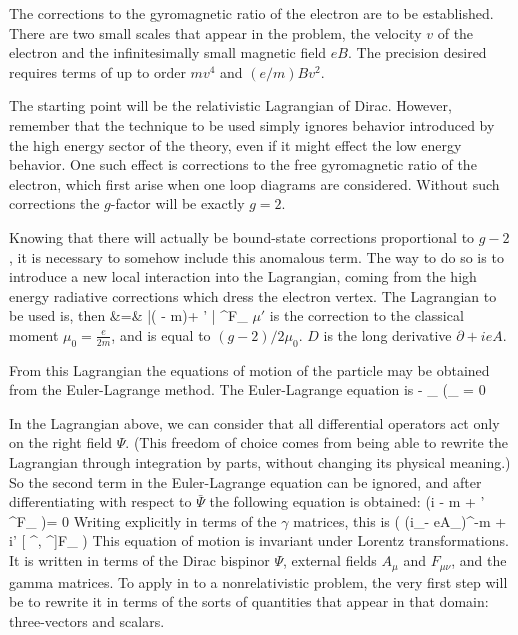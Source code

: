 The corrections to the gyromagnetic ratio of the electron are to be established.  There are two small scales that appear in the problem, the velocity $v$ of the electron and the infinitesimally small magnetic field $eB$.  The precision desired requires terms of up to order $mv^4$ and $ (e/m)Bv^2$.

The starting point will be the relativistic Lagrangian of Dirac.  However, remember that the technique to be used simply ignores behavior introduced by the high energy sector of the theory, even if it might effect the low energy behavior.  One such effect is corrections to the free gyromagnetic ratio of the electron, which first arise when one loop diagrams are considered.  Without such corrections the $g$-factor will be exactly $g=2$.

Knowing that there will actually be bound-state corrections proportional to $g-2$, it is necessary to somehow include this anomalous term.  The way to do so is to introduce a new local interaction into the Lagrangian, coming from the high energy radiative corrections which dress the electron vertex.  The Lagrangian to be used is, then
\beqa
{} &=&	
	\bar{\Psi}( - m)\Psi +  \mu' \bar{\Psi} \sigma^{\mu\nu}F_{\mu\nu} \Psi	
\eeqa
$\mu'$ is the correction to the classical moment $\mu_0 = \frac{e}{2m}$, and is equal to $(g-2)/2 \mu_0$.  $D$ is the long derivative $\partial + ieA$.


From this Lagrangian the equations of motion of the particle may be obtained from the Euler-Lagrange method.  The Euler-Lagrange equation is
\beq
{} - \partial_\mu {} {\partial (\partial_\mu {\bar{\Psi})} } 
	= 0	
\eeq

In the Lagrangian above, we can consider that all differential operators act only on the right field $\Psi$.  (This freedom of choice comes from being able to rewrite the Lagrangian through integration by parts, without changing its physical meaning.)  So the second term in the Euler-Lagrange equation can be ignored, and after differentiating with respect to $\bar{\Psi}$ the following equation is obtained:
\beq
	(i - m +  \mu'  \sigma^{\mu\nu}F_{\mu\nu} )\Psi = 0	
\eeq
Writing explicitly in terms of the $\gamma$ matrices, this is
\beq \label{eq:Sh:eom}
	\left( (i\partial_\mu- eA_\mu)\gamma^\mu -m + i\mu' [ \gamma^\mu, \gamma^\nu]F_{\mu\nu} \right) 
\eeq
This equation of motion is invariant under Lorentz transformations.  It is written in terms of the Dirac bispinor $\Psi$, external fields $A_\mu$ and $F_{\mu\nu}$, and the gamma matrices.  To apply in to a nonrelativistic problem, the very first step will be to rewrite it in terms of the sorts of quantities that appear in that domain: three-vectors and scalars.

